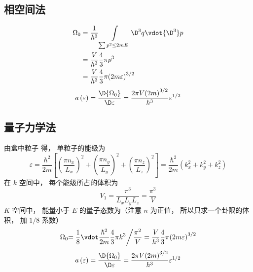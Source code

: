 \subsection{相空间法}
\begin{equation}
    \begin{aligned}
    {\Omega _0} & = \frac{1}{{{h^3}}}\int\limits_{\sum {{p^2}}  \le 2mE} {{ \D ^3}q \vdot { \D ^3}p}  \\
    & = \frac{V}{{{h^3}}}\frac{4}{3}\pi {p^3} \\
    & = \frac{V}{{{h^3}}}\frac{4}{3}\pi {\left( {2m\varepsilon } \right)^{3/2}}
    \end{aligned}
  \end{equation}
  \begin{equation}
    a\left( \varepsilon  \right) = \frac{{ \D {\Omega _0}}}{{ \D \varepsilon }} = \frac{{2\pi V{{\left( {2m} \right)}^{3/2}}}}{{{h^3}}}{\varepsilon ^{1/2}}
  \end{equation}

\subsection{量子力学法}
由盒中粒子%
得， 单粒子的能级为
\begin{equation}
\varepsilon = \frac{{{\hbar ^2}}}{{2m}}\left[ {{{\left( {\frac{{\pi {n_x}}}{{{L_x}}}} \right)}^2} + {{\left( {\frac{{\pi {n_y}}}{{{L_y}}}} \right)}^2} + {{\left( {\frac{{\pi {n_z}}}{{{L_z}}}} \right)}^2}} \right] = \frac{{{\hbar ^2}}}{{2m}}\left( {k_x^2 + k_y^2 + k_z^2} \right)
\end{equation}
在 $k$ 空间中， 每个能级所占的体积为
\begin{equation}
{V_1} = \frac{{{\pi ^3}}}{{{L_x}{L_y}{L_z}}} = \frac{{{\pi ^3}}}{V}
\end{equation}
  $K$ 空间中， 能量小于 $E$ 的量子态数为（注意 $n$ 为正值， 所以只求一个卦限的体积， 加 $1/8$ 系数）
\begin{equation}
    {\Omega _0}{{ = \frac{1}{8} \vdot \frac{{{\hbar ^2}}}{{2m}}\frac{4}{3}\pi {k^3}} \mathord{\left/
 {\vphantom {{ = \frac{1}{8} \vdot \frac{{{\hbar ^2}}}{{2m}}\frac{4}{3}\pi {k^3}} {\frac{{{\pi ^2}}}{V}}}} \right.
 \kern-\nulldelimiterspace} {\frac{{{\pi ^2}}}{V}}} = \frac{V}{{{h^3}}}\frac{4}{3}\pi {\left( {2m\varepsilon } \right)^{3/2}}
\end{equation}
\begin{equation}
      a\left( \varepsilon  \right) = \frac{{ \D {\Omega _0}}}{{ \D \varepsilon }} = \frac{{2\pi V{{\left( {2m} \right)}^{3/2}}}}{{{h^3}}}{\varepsilon ^{1/2}}
\end{equation}

